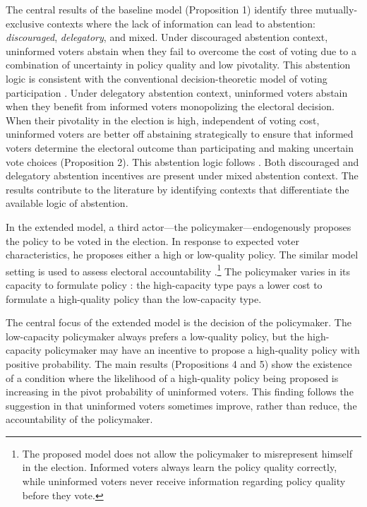 \documentclass[letterpaper, 12pt]{article}
\begin{document}
    \par The central results of the baseline model (Proposition 1) identify three mutually-exclusive contexts where the lack of information can lead to abstention: \textit{discouraged}, \textit{delegatory}, and mixed. Under discouraged abstention context, uninformed voters abstain when they fail to overcome the cost of voting due to a combination of uncertainty in policy quality and low pivotality. This abstention logic is consistent with the conventional decision-theoretic model of voting participation \citep{Downs1957anec, Riker1968thof, Matsusaka1995exvo}. Under delegatory abstention context, uninformed voters abstain when they benefit from informed voters monopolizing the electoral decision. When their pivotality in the election is high, independent of voting cost, uninformed voters are better off abstaining strategically to ensure that informed voters determine the electoral outcome than participating and making uncertain vote choices (Proposition 2). This abstention logic follows \cite{Feddersen1996thsw, Feddersen1999abin}. Both discouraged and delegatory abstention incentives are present under mixed abstention context. The results contribute to the literature by identifying contexts that differentiate the available logic of abstention.
    
    \par In the extended model, a third actor---the policymaker---endogenously proposes the policy to be voted in the election. In response to expected voter characteristics, he proposes either a high or low-quality policy. The similar model setting is used to assess electoral accountability \citep{Ashworth2014isvo, Prato2016thvo}.\footnote{The proposed model does not allow the policymaker to misrepresent himself in the election. Informed voters always learn the policy quality correctly, while uninformed voters never receive information regarding policy quality before they vote.} The policymaker varies in its capacity to formulate policy \citep{Gailmard2007slan, Huber2004buca}: the high-capacity type pays a lower cost to formulate a high-quality policy than the low-capacity type. 

    \par The central focus of the extended model is the decision of the policymaker. The low-capacity policymaker always prefers a low-quality policy, but the high-capacity policymaker may have an incentive to propose a high-quality policy with positive probability. The main results (Propositions 4 and 5) show the existence of a condition where the likelihood of a high-quality policy being proposed is increasing in the pivot probability of uninformed voters. This finding follows the suggestion in \cite{Ashworth2014isvo} that uninformed voters sometimes improve, rather than reduce, the accountability of the policymaker. 
    
\end{document}
